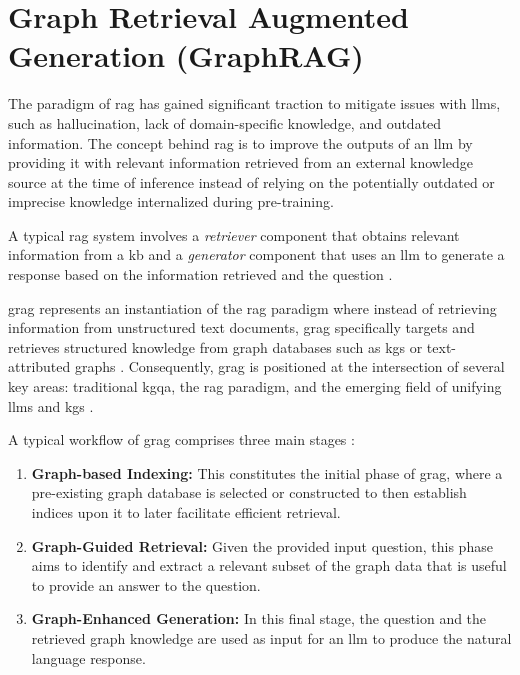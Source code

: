 

\section{Graph Retrieval Augmented Generation (GraphRAG)}

 The paradigm of \acrfull{rag} has gained significant traction to mitigate issues with \glspl{llm}, such as hallucination, lack of domain-specific knowledge, and outdated information. The concept behind \gls{rag} is to improve the outputs of an \gls{llm} by providing it with relevant information retrieved from an external knowledge source at the time of inference instead of relying on the potentially outdated or imprecise knowledge internalized during pre-training. \cite{lewis_retrieval-augmented_2021,wu_retrieval-augmented_2024,peng_graph_2024,yang_give_2024}

A typical \gls{rag} system involves a \emph{retriever} component that obtains relevant information from a \gls{kb} and a \emph{generator} component that uses an \gls{llm} to generate a response based on the information retrieved and the question \cite{wu_retrieval-augmented_2024,yu_evaluation_2024}.

\acrfull{grag} represents an instantiation of the \gls{rag} paradigm where instead of retrieving information from unstructured text documents, \gls{grag} specifically targets and retrieves structured knowledge from graph databases such as \glspl{kg} or text-attributed graphs \cite{peng_graph_2024}. Consequently, \gls{grag} is positioned at the intersection of several key areas: traditional \gls{kgqa}, the \gls{rag} paradigm, and the emerging field of unifying \glspl{llm} and \glspl{kg} \cite{pan_unifying_2024,peng_graph_2024}.

A typical workflow of \gls{grag} comprises three main stages \cite{peng_graph_2024}:

\begin{enumerate}
    \item \textbf{Graph-based Indexing:} This constitutes the initial phase of \gls{grag}, where a pre-existing graph database is selected or constructed to then establish indices upon it to later facilitate efficient retrieval.
    \item \textbf{Graph-Guided Retrieval:} Given the provided input question, this phase aims to identify and extract a relevant subset of the graph data that is useful to provide an answer to the question.
    \item \textbf{Graph-Enhanced Generation:} In this final stage, the question and the retrieved graph knowledge are used as input for an \gls{llm} to produce the natural language response.
\end{enumerate}


